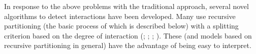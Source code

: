 \documentclass[12pt]{article}
\begin{document}

%


In response to the above problems with the traditional approach, several novel algorithms to detect interactions have been developed. Many use recursive partitioning (the basic process of which is described below) with a splitting criterion based on the degree of interaction (\cite{Zeileis2008}; \cite{Su2009}; \cite{Lipkovich2011}; \cite{Dusseldorp2014}). These (and models based on recursive partitioning in general) have the advantage of being easy to interpret.

%
%
%
%
\end{document}
